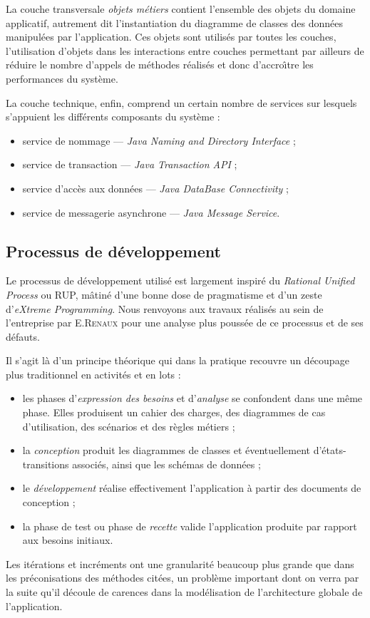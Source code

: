 La couche transversale \emph{objets m\'etiers} contient l'ensemble
des objets du domaine applicatif, autrement dit l'instantiation du
diagramme de classes des donn\'ees manipul\'ees par
l'application. Ces objets sont utilis\'es par toutes les couches, l'utilisation
d'objets dans les interactions entre couches permettant par ailleurs de
r\'eduire le nombre d'appels de m\'ethodes r\'ealis\'es et donc
d'accro\^{\i}tre les performances du syst\`eme. 

La couche technique, enfin, comprend un certain nombre de services sur
lesquels s'appuient les diff\'erents composants du syst\`eme :
\begin{itemize}
  \item service de nommage --- \emph{Java Naming and Directory
  Interface} ;
\item service de transaction --- \emph{Java Transaction API} ;
\item service d'acc\`es aux donn\'ees --- \emph{Java DataBase
    Connectivity} ;
\item service de messagerie asynchrone --- \emph{Java Message Service}.
\end{itemize}

\subsection{Processus de d\'eveloppement}

Le processus de d\'eveloppement utilis\'e est largement inspir\'e
du \emph{Rational Unified Process} ou \textsf{RUP}, m\^atin\'e d'une
bonne dose de pragmatisme et d'un zeste d'\emph{eXtreme
  Programming}. Nous renvoyons aux travaux r\'ealis\'es au sein de
l'entreprise par E.\textsc{Renaux}\cite{these-manu} pour une analyse
plus pouss\'ee de ce processus et de ses d\'efauts. 

Il s'agit l\`a d'un principe th\'eorique qui dans la  pratique
recouvre un d\'ecoupage plus \og traditionnel\fg{}  en activit\'es et
en lots :
\begin{itemize}
  \item les phases d'\emph{expression des besoins} et d'\emph{analyse} se confondent dans une
  m\^eme phase. Elles produisent un cahier des charges, des
  diagrammes de cas d'utilisation, des sc\'enarios  et des r\`egles
  m\'etiers ;
\item la \emph{conception} produit les
  diagrammes de classes et \'eventuellement d'\'etats-transitions
  associ\'es, ainsi que les sch\'emas de donn\'ees ;
\item le \emph{d\'eveloppement} r\'ealise effectivement
  l'application \`a partir des documents de conception ;
\item la phase de test ou phase de \emph{recette} valide l'application
  produite par rapport aux besoins initiaux.
\end{itemize}
Les it\'erations et incr\'ements  ont une granularit\'e beaucoup
plus grande que dans les pr\'econisations des m\'ethodes cit\'ees,
un probl\`eme  important dont on verra par la suite qu'il
d\'ecoule de carences dans la mod\'elisation de l'architecture
globale de l'application.

